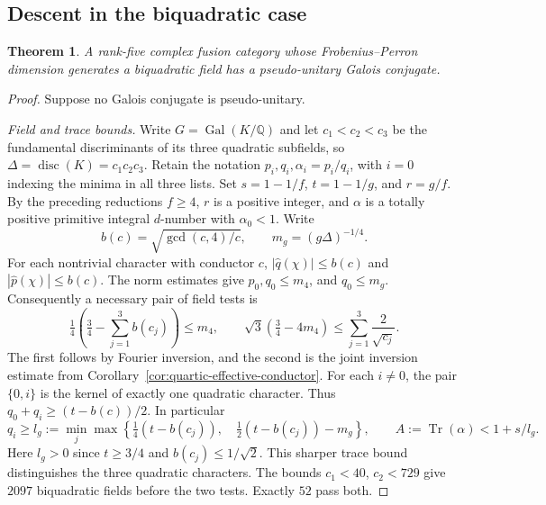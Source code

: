 \documentclass[11pt,a4paper]{article}
\newtheorem{theorem}{Theorem}[section]
\numberwithin{equation}{section}
\begin{document}
\subsection{Descent in the biquadratic case}
\begin{theorem}\label{thm:biquartic-descent}
A rank-five complex fusion category whose Frobenius--Perron dimension
generates a biquadratic field has a pseudo-unitary Galois conjugate.
\end{theorem}
\begin{proof}
Suppose no Galois conjugate is pseudo-unitary.

\medskip\noindent\emph{Field and trace bounds.}
Write $G=\operatorname{Gal}(K/\mathbb Q)$
and let $c_1<c_2<c_3$ be the fundamental discriminants of its three
quadratic subfields, so $\Delta=\operatorname{disc}(K)=c_1c_2c_3$.
Retain the notation $p_i,q_i,\alpha_i=p_i/q_i$, with $i=0$ indexing
the minima in all three lists. Set $s=1-1/f$, $t=1-1/g$, and
$r=g/f$. By the preceding reductions $f\ge4$, $r$ is a positive
integer, and $\alpha$ is a totally positive primitive integral
$d$-number with $\alpha_0<1$. Write
\[
 b(c)=\sqrt{\gcd(c,4)/c},\qquad m_g=(g\Delta)^{-1/4}.
\]
For each nontrivial character with conductor $c$,
$|\widehat q(\chi)|\le b(c)$ and $|\widehat p(\chi)|\le b(c)$.
The norm estimates give $p_0,q_0\le m_4$, and $q_0\le m_g$.
Consequently a necessary pair of field tests is
\[
 \tfrac14\left(\tfrac34-\sum_{j=1}^3b(c_j)\right)\le m_4,
 \qquad
 \sqrt3\left(\tfrac34-4m_4\right)\le
       \sum_{j=1}^3\frac{2}{\sqrt{c_j}} .
\]
The first follows by Fourier inversion, and the second is the joint
inversion estimate from Corollary~\ref{cor:quartic-effective-conductor}.
For each $i\ne0$, the pair $\{0,i\}$ is the kernel of exactly one
quadratic character. Thus $q_0+q_i\ge(t-b(c))/2$. In particular
\[
 q_i\ge l_g:=\min_j\max\left\{
       \tfrac14(t-b(c_j)),\quad\tfrac12(t-b(c_j))-m_g\right\},
 \qquad A:=\operatorname{Tr}(\alpha)<1+s/l_g .
\]
Here $l_g>0$ since $t\ge3/4$ and $b(c_j)\le1/\sqrt2$.
This sharper trace bound distinguishes the three quadratic characters.
The bounds $c_1<40$, $c_2<729$ give $2097$ biquadratic fields before
the two tests. Exactly $52$ pass both.


\end{proof}
\end{document}
